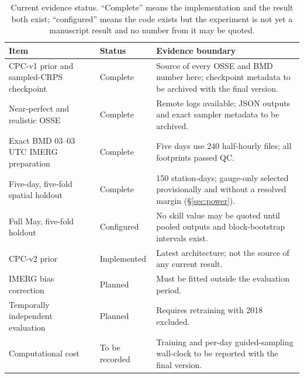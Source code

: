 \documentclass[10pt,twocolumn]{article}
\begin{document}
\begin{table}[!ht]
\centering
\caption{Current evidence status. ``Complete'' means the implementation and
the result both exist; ``configured'' means the code exists but the experiment
is not yet a manuscript result and no number from it may be quoted.}
\label{tab:status}
\small
\begin{tabular}{L{0.30\textwidth}L{0.13\textwidth}L{0.48\textwidth}}
\toprule
Item & Status & Evidence boundary \\
\midrule
CPC-v1 prior and sampled-CRPS checkpoint & Complete & Source of every OSSE and BMD number here; checkpoint metadata to be archived with the final version. \\
Near-perfect and realistic OSSE & Complete & Remote logs available; JSON outputs and exact sampler metadata to be archived. \\
Exact BMD 03--03 UTC IMERG preparation & Complete & Five days use 240 half-hourly files; all footprints passed QC. \\
Five-day, five-fold spatial holdout & Complete & 150 station-days; gauge-only selected provisionally and without a resolved margin (\S\ref{sec:power}). \\
Full May, five-fold holdout & Configured & No skill value may be quoted until pooled outputs and block-bootstrap intervals exist. \\
CPC-v2 prior & Implemented & Latest architecture; not the source of any current result. \\
IMERG bias correction & Planned & Must be fitted outside the evaluation period. \\
Temporally independent evaluation & Planned & Requires retraining with 2018 excluded. \\
Computational cost & To be recorded & Training and per-day guided-sampling wall-clock to be reported with the final version. \\
\bottomrule
\end{tabular}
\end{table}
\end{document}
